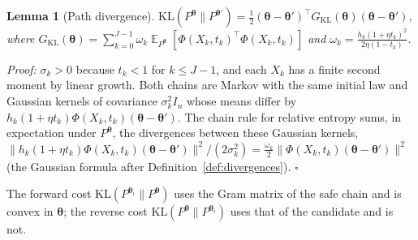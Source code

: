 \documentclass{article}
\DeclareMathOperator{\E}{\mathbb{E}}
\newcommand{\bth}{\boldsymbol{\theta}}
\newcommand{\KL}{\mathrm{KL}}
\theoremstyle{plain}
\newtheorem{lemma}[theorem]{Lemma}
\theoremstyle{remark}
\begin{document}
\begin{lemma}[Path divergence]\label{lem:chain_kl}
$\KL(P^{\bth}\|P^{\bth'})=\frac12(\bth-\bth')^\top G_{\KL}(\bth)(\bth-\bth')$, where
$G_{\KL}(\bth)=\sum_{k=0}^{J-1}\omega_k\E_{P^{\bth}}[\Phi(X_k,t_k)^\top\Phi(X_k,t_k)]$ and $\omega_k=\frac{h_k(1+\eta t_k)^2}{2\eta(1-t_k)}$.
\end{lemma}
\textit{Proof:}
$\sigma_k>0$ because $t_k<1$ for $k\le J-1$, and each $X_k$ has a finite second moment by linear growth.
Both chains are Markov with the same initial law and Gaussian kernels of covariance $\sigma_k^2I_n$
whose means differ by $h_k(1+\eta t_k)\Phi(X_k,t_k)(\bth-\bth')$. The chain rule for relative entropy
\citep[Thm.~2.5.3]{cover2006elements} sums, in expectation under $P^{\bth}$, the divergences between these Gaussian kernels,
$\|h_k(1+\eta t_k)\Phi(X_k,t_k)(\bth-\bth')\|^2/(2\sigma_k^2)=\frac{\omega_k}{2}\|\Phi(X_k,t_k)(\bth-\bth')\|^2$ (the Gaussian formula after
Definition~\ref{def:divergences}).
\hfill$\square$

The forward cost $\KL(P^{\bth_i}\|P^{\bth})$ uses the Gram matrix of the safe chain and is convex in $\bth$; the
reverse cost $\KL(P^{\bth}\|P^{\bth_i})$ uses that of the candidate and is not.
\end{document}
